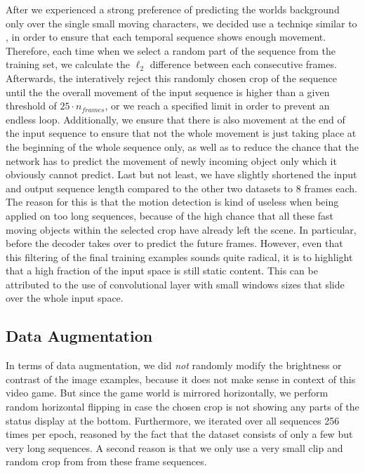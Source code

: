 After we experienced a strong preference of predicting the worlds background only over the single small moving characters, we decided use a techniqe similar to \parencite{deep_multiscale_video_pred}, in order to ensure that each temporal sequence shows enough movement. Therefore, each time when we select a random part of the sequence from the training set, we calculate the $\ell_2$ difference between each consecutive frames. Afterwards, the interatively reject this randomly chosen crop of the sequence until the the overall movement of the input sequence is higher than a given threshold of $25 \cdot n_{frames}$, or we reach a specified limit in order to prevent an endless loop. Additionally, we ensure that there is also movement at the end of the input sequence to ensure that not the whole movement is just taking place at the beginning of the whole sequence only, as well as to reduce the chance that the network has to predict the movement of newly incoming object only which it obviously cannot predict. Last but not least, we have slightly shortened the input and output sequence length compared to the other two datasets to \num{8} frames each. The reason for this is that the motion detection is kind of useless when being applied on too long sequences, because of the high chance that all these fast moving objects within the selected crop have already left the scene. In particular, before the decoder takes over to predict the future frames. However, even that this filtering of the final training examples sounds quite radical, it is to highlight that a high fraction of the input space is still static content. This can be attributed to the use of convolutional layer with small windows sizes that slide over the whole input space.

\subsection{Data Augmentation}

In terms of data augmentation, we did \textit{not} randomly modify the brightness or contrast of the image examples, because it does not make sense in context of this video game. But since the game world is mirrored horizontally, we perform random horizontal flipping in case the chosen crop is not showing any parts of the status display at the bottom. Furthermore, we iterated over all sequences \num{256} times per epoch, reasoned by the fact that the dataset consists of only a few but very long sequences. A second reason is that we only use a very small clip and random crop from from these frame sequences. 


